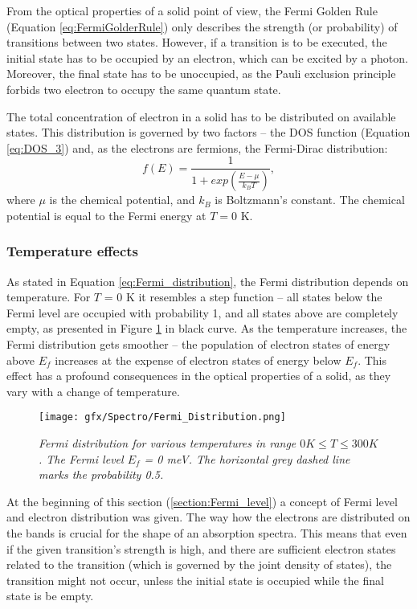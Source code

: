 \documentclass[titlepage,a4paper]{book}
\newcommand{\wciecie}{\quad\phantom{v}}
\begin{document}
From the optical properties of a solid point of view, the Fermi Golden Rule (Equation \ref{eq:FermiGolderRule}) only describes the strength (or probability) of transitions between two states. However, if a transition is to be executed, the initial state has to be occupied by an electron, which can be excited by a photon. Moreover, the final state has to be unoccupied, as the Pauli exclusion principle forbids two electron to occupy the same quantum state. 

The total concentration of electron in a solid has to be distributed on available states. This distribution is governed by two factors -- the DOS function (Equation \ref{eq:DOS_3}) and, as the electrons are fermions, the Fermi-Dirac distribution:
\begin{equation}
\label{eq:Fermi_distribution}
f(E) = \frac{1}{1+exp\left(\frac{E-\mu}{k_B T}\right)},
\end{equation}
where $\mu$ is the chemical potential, and $k_B$ is Boltzmann's constant. The chemical potential is equal to the Fermi energy at $T = 0$ K.

\subsubsection{Temperature effects}
\wciecie

As stated in Equation \ref{eq:Fermi_distribution}, the Fermi distribution depends on temperature. For $T$ = 0 K it resembles a step function -- all states below the Fermi level are occupied with probability 1, and all states above are completely empty, as presented in Figure \ref{fig:Fermi_Distribution} in black curve. As the temperature increases, the Fermi distribution gets smoother -- the population of electron states of energy above $E_f$ increases at the expense of electron states of energy below $E_f$. This effect has a profound consequences in the optical properties of a solid, as they vary with a change of temperature.

\begin{figure}[ht]
	\centering
	\texttt{[image: gfx/Spectro/Fermi\_Distribution.png]}
	\vspace{-10pt}
	\caption{\textit{Fermi distribution for various temperatures in range $0 K \leq T \leq 300 K$. The Fermi level $E_f$ = 0 meV. The horizontal grey dashed line marks the probability 0.5.}}
	\label{fig:Fermi_Distribution}
\end{figure}

At the beginning of this section (\ref{section:Fermi_level}) a concept of Fermi level and electron distribution was given. The way how the electrons are distributed on the bands is crucial for the shape of an absorption spectra. This means that even if the given transition's strength is high, and there are sufficient electron states related to the transition (which is governed by the joint density of states), the transition might not occur, unless the initial state is occupied while the final state is be empty. 
\end{document}
